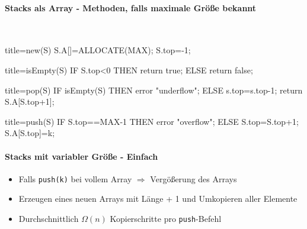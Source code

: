 \documentclass[
    ngerman,
    color=3b,
    load_common, %
    summary,
    boxarc,
]{tuda_summary}
\begin{document}
\paragraph{Stacks als Array - Methoden, falls maximale Grö\ss{}e bekannt}\mbox{}\\
\begin{minipage}[t]{.5\textwidth}\mbox{}
    \begin{codeBlock}[autogobble]{title=new(S)}
        S.A[]=ALLOCATE(MAX);
        S.top=-1;
    \end{codeBlock}
\end{minipage}
\begin{minipage}[t]{.5\textwidth}\mbox{}
    \begin{codeBlock}[autogobble]{title=isEmpty(S)}
        IF S.top<0 THEN
          return true;
        ELSE
          return false;
    \end{codeBlock}
\end{minipage}
\begin{minipage}[t]{.5\textwidth}\mbox{}
    \begin{codeBlock}[autogobble]{title=pop(S)}
        IF isEmpty(S) THEN
          error "underflow";
        ELSE
          s.top=s.top-1;
          return S.A[S.top+1];
    \end{codeBlock}
\end{minipage}
\begin{minipage}[t]{.5\textwidth}\mbox{}
    \begin{codeBlock}[autogobble]{title=push(S)}
        IF S.top==MAX-1 THEN
          error "overflow";
        ELSE
          S.top=S.top+1;
          S.A[S.top]=k;
    \end{codeBlock}
\end{minipage}

\paragraph{Stacks mit variabler Grö\ss{}e - Einfach}
\begin{itemize}
    \item Falls \texttt{push(k)} bei vollem Array $\Rightarrow$ Vergö\ss{}erung des Arrays
    \item Erzeugen eines neuen Arrays mit Länge + 1 und Umkopieren aller Elemente
    \item Durchschnittlich $\Omega(n)$ Kopierschritte pro \texttt{push}-Befehl
\end{itemize}
\clearpage
\end{document}
